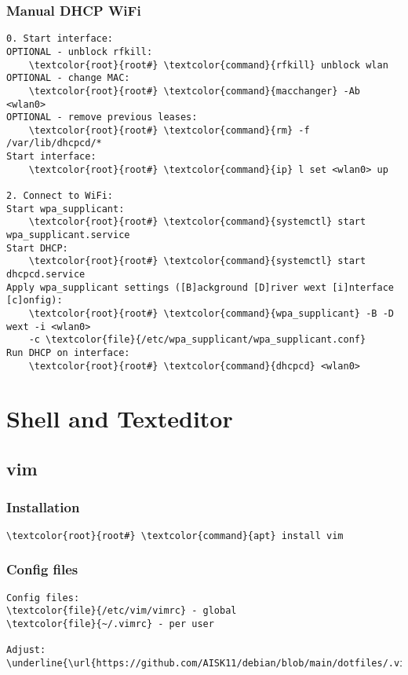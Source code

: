 \documentclass[10pt, a4paper, onecolumn, openany]{book} %
\begin{document}
\subsection{Manual DHCP WiFi}
\begin{Verbatim}[commandchars=\\\{\}]
0. Start interface:
OPTIONAL - unblock rfkill:
    \textcolor{root}{root#} \textcolor{command}{rfkill} unblock wlan
OPTIONAL - change MAC:
    \textcolor{root}{root#} \textcolor{command}{macchanger} -Ab <wlan0>
OPTIONAL - remove previous leases:
    \textcolor{root}{root#} \textcolor{command}{rm} -f /var/lib/dhcpcd/*
Start interface:
    \textcolor{root}{root#} \textcolor{command}{ip} l set <wlan0> up

2. Connect to WiFi:
Start wpa_supplicant:
    \textcolor{root}{root#} \textcolor{command}{systemctl} start wpa_supplicant.service
Start DHCP:
    \textcolor{root}{root#} \textcolor{command}{systemctl} start dhcpcd.service
Apply wpa_supplicant settings ([B]ackground [D]river wext [i]nterface [c]onfig):
    \textcolor{root}{root#} \textcolor{command}{wpa_supplicant} -B -D wext -i <wlan0>
    -c \textcolor{file}{/etc/wpa_supplicant/wpa_supplicant.conf}
Run DHCP on interface:
    \textcolor{root}{root#} \textcolor{command}{dhcpcd} <wlan0>
\end{Verbatim}



\chapter{Shell and Texteditor}
\section{vim}
\subsection{Installation}
\begin{Verbatim}[commandchars=\\\{\}]
    \textcolor{root}{root#} \textcolor{command}{apt} install vim
\end{Verbatim}
\subsection{Config files}
\begin{Verbatim}[commandchars=\\\{\}]
Config files:
\textcolor{file}{/etc/vim/vimrc} - global
\textcolor{file}{~/.vimrc} - per user

Adjust:
\underline{\url{https://github.com/AISK11/debian/blob/main/dotfiles/.vimrc}}
\end{Verbatim}
\end{document}
